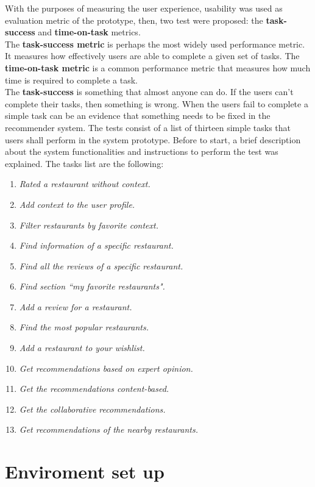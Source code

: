 With the purposes of measuring the user experience, usability was used
as evaluation metric of the prototype, then, two test were proposed: the
\textbf{task-success} and \textbf{time-on-task} metrics. \\ 
The \textbf{task-success metric} is perhaps the most widely used
performance metric. It measures how effectively users are able to
complete a given set of tasks.  The \textbf{time-on-task metric} is a
common performance metric that measures how much time is required to
complete a task\cite{albert2013measuring}.\\
The \textbf{task-success} is something that almost anyone can do. 
If the users can't complete their tasks, then something is wrong. 
When the users fail to complete a simple task can be an evidence 
that something needs to be fixed in the recommender system.  
The tests consist of a list of thirteen simple tasks that users shall
perform in the system prototype. Before to start, a brief description
about the system functionalities and instructions to perform the test
was explained. The tasks list are the following:
\begin{enumerate} 
\item \textit{Rated a restaurant without context.}
\item \textit{Add context to the user profile.}
\item \textit{Filter restaurants by favorite context.}
\item \textit{Find information of a specific restaurant.}
\item \textit{Find all the reviews of a specific restaurant.} 
\item \textit{Find section ``my favorite restaurants".}
\item \textit{Add a review for a restaurant.}
\item \textit{Find the most popular restaurants.}
\item \textit{Add a restaurant to your wishlist.}
\item \textit{Get recommendations based on expert opinion.} 
\item \textit{Get the recommendations content-based.}
\item \textit{Get the collaborative recommendations.}
\item \textit{Get recommendations of the nearby restaurants.}
\end{enumerate} 

\section{Enviroment set up}


